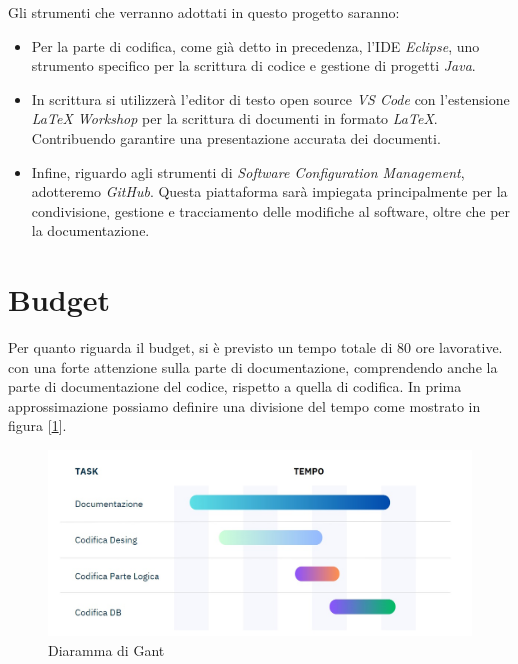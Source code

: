 \documentclass{book}
\begin{document}
Gli strumenti che verranno adottati in questo progetto saranno:
\begin{itemize}
    \item Per la parte di codifica, come già detto in precedenza, l'IDE \textit{Eclipse}, uno strumento specifico per la scrittura di codice e gestione di progetti \textit{Java}.
    \item In scrittura si utilizzerà l'editor di testo open source \textit{VS Code} con l'estensione \textit{LaTeX Workshop} per la scrittura di documenti in formato \textit{LaTeX}. Contribuendo garantire una presentazione accurata dei documenti.
    \item Infine, riguardo agli strumenti di \textit{Software Configuration Management}, adotteremo \textit{GitHub}. Questa piattaforma sarà impiegata principalmente per la condivisione, gestione e tracciamento delle modifiche al software, oltre che per la documentazione. 

\end{itemize}

\section{Budget}

Per quanto riguarda il budget, si è previsto un tempo totale di 80 ore lavorative. con una forte attenzione sulla parte di documentazione, comprendendo anche la parte di documentazione del codice, rispetto a quella di codifica.
In prima approssimazione possiamo definire una divisione del tempo come mostrato in figura [\ref{fig: diagramma_gant}]. 
\begin{figure}[h]
    \centering
    \includegraphics[width = 1\linewidth]{Diagramma_Gant.jpg}
    \caption{Diaramma di Gant}
    \label{fig: diagramma_gant}    
\end{figure}
\end{document}
